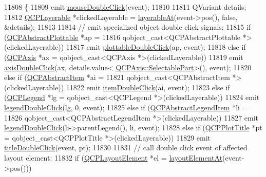 \begin{DoxyCode}
11808                                                           \{
11809   emit \hyperlink{class_q_custom_plot_a9b232142c64fcf273a953ee08e5b90e9}{mouseDoubleClick}(event);
11810 
11811   QVariant details;
11812   \hyperlink{class_q_c_p_layerable}{QCPLayerable} *clickedLayerable = \hyperlink{class_q_custom_plot_a3fffd1d8364f657482ae985e0b5aa028}{layerableAt}(event->pos(), \textcolor{keyword}{false}, &details);
11813 
11814   \textcolor{comment}{// emit specialized object double click signals:}
11815   \textcolor{keywordflow}{if} (\hyperlink{class_q_c_p_abstract_plottable}{QCPAbstractPlottable} *ap =
11816           qobject\_cast<QCPAbstractPlottable *>(clickedLayerable))
11817     emit \hyperlink{class_q_custom_plot_af2e6f1cea923dae437681d01ce7d0c31}{plottableDoubleClick}(ap, event);
11818   \textcolor{keywordflow}{else} \textcolor{keywordflow}{if} (\hyperlink{class_q_c_p_axis}{QCPAxis} *ax = qobject\_cast<QCPAxis *>(clickedLayerable))
11819     emit \hyperlink{class_q_custom_plot_a6df35357460181a72da3e93d600f5256}{axisDoubleClick}(ax, details.value<
      \hyperlink{class_q_c_p_axis_abee4c7a54c468b1385dfce2c898b115f}{QCPAxis::SelectablePart}>(), event);
11820   \textcolor{keywordflow}{else} \textcolor{keywordflow}{if} (\hyperlink{class_q_c_p_abstract_item}{QCPAbstractItem} *ai =
11821                qobject\_cast<QCPAbstractItem *>(clickedLayerable))
11822     emit \hyperlink{class_q_custom_plot_ac83aa9f5a3e9bb3efc9cdc763dcd42a6}{itemDoubleClick}(ai, event);
11823   \textcolor{keywordflow}{else} \textcolor{keywordflow}{if} (\hyperlink{class_q_c_p_legend}{QCPLegend} *lg = qobject\_cast<QCPLegend *>(clickedLayerable))
11824     emit \hyperlink{class_q_custom_plot_a0250f835c044521df1619b132288bca7}{legendDoubleClick}(lg, 0, event);
11825   \textcolor{keywordflow}{else} \textcolor{keywordflow}{if} (\hyperlink{class_q_c_p_abstract_legend_item}{QCPAbstractLegendItem} *li =
11826                qobject\_cast<QCPAbstractLegendItem *>(clickedLayerable))
11827     emit \hyperlink{class_q_custom_plot_a0250f835c044521df1619b132288bca7}{legendDoubleClick}(li->parentLegend(), li, event);
11828   \textcolor{keywordflow}{else} \textcolor{keywordflow}{if} (\hyperlink{class_q_c_p_plot_title}{QCPPlotTitle} *pt = qobject\_cast<QCPPlotTitle *>(clickedLayerable))
11829     emit \hyperlink{class_q_custom_plot_ad51d65f6abf5edfaeef6e0519a4c1a2f}{titleDoubleClick}(event, pt);
11830 
11831   \textcolor{comment}{// call double click event of affected layout element:}
11832   \textcolor{keywordflow}{if} (\hyperlink{class_q_c_p_layout_element}{QCPLayoutElement} *el = \hyperlink{class_q_custom_plot_a840458186d4483c8a42d6a399448d38f}{layoutElementAt}(event->pos()))

\end{DoxyCode}
